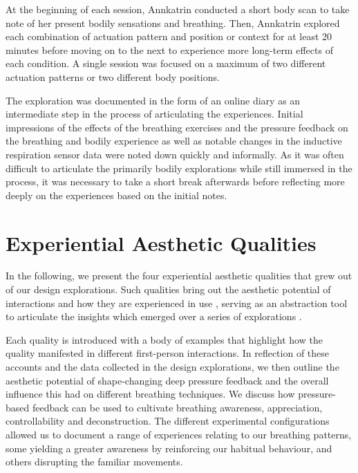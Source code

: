 At the beginning of each session, Annkatrin conducted a short body scan to take note of her present bodily sensations and breathing. Then, Annkatrin explored each combination of actuation pattern and position or context for at least 20 minutes before moving on to the next to experience more long-term effects of each condition. A single session was focused on a maximum of two different actuation patterns or two different body positions.

The exploration was documented in the form of an online diary as an intermediate step in the process of articulating the experiences. Initial impressions of the effects of the breathing exercises and the pressure feedback on the breathing and bodily experience as well as notable changes in the inductive respiration sensor data were noted down quickly and informally. As it was often difficult to articulate the primarily bodily explorations while still immersed in the process, it was necessary to take a short break afterwards before reflecting more deeply on the experiences based on the initial notes.


\section{Experiential Aesthetic Qualities}
\label{sec:aesthetic_qualities}

In the following, we present the four experiential aesthetic qualities that grew out of our design explorations. Such qualities bring out the aesthetic potential of interactions and how they are experienced in use \cite{lowgren_toward_2009}, serving as an abstraction tool to articulate the insights which emerged over a series of explorations \cite{stahl_evocative_2014}.

Each quality is introduced with a body of examples that highlight how the quality manifested in different first-person interactions. In reflection of these accounts and the data collected in the design explorations, we then outline the aesthetic potential of shape-changing deep pressure feedback and the overall influence this had on different breathing techniques. We discuss how pressure-based feedback can be used to cultivate breathing awareness, appreciation, controllability and deconstruction. The different experimental configurations allowed us to document a range of experiences relating to our breathing patterns, some yielding a greater awareness by reinforcing our habitual behaviour, and others disrupting the familiar movements.
% 


